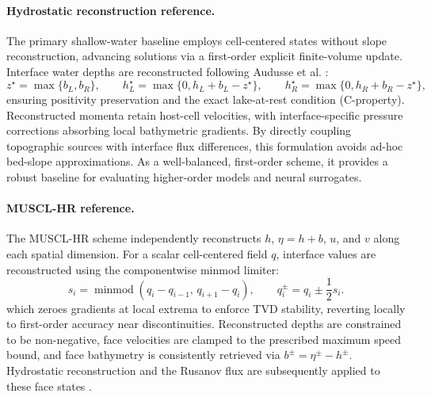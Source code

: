 \paragraph{Hydrostatic reconstruction reference.} The primary shallow-water baseline employs cell-centered states without slope reconstruction, advancing solutions via a first-order explicit finite-volume update. Interface water depths are reconstructed following Audusse et al. \citep{audusse2004hydrostatic}:
\begin{equation}
z ^ \star = \max\{b_L, b_R\}, \qquad
h_L ^ \star = \max\{0, h_L + b_L - z ^ \star\}, \qquad
h_R ^ \star = \max\{0, h_R + b_R - z ^ \star\},
\end{equation}
ensuring positivity preservation and the exact lake-at-rest condition (C-property). Reconstructed momenta retain host-cell velocities, with interface-specific pressure corrections absorbing local bathymetric gradients. By directly coupling topographic sources with interface flux differences, this formulation avoids ad-hoc bed-slope approximations. As a well-balanced, first-order scheme, it provides a robust baseline for evaluating higher-order models and neural surrogates.

\paragraph{MUSCL-HR reference.}
The MUSCL-HR scheme independently reconstructs $h$, $\eta = h + b$, $u$, and $v$ along each spatial dimension. For a scalar cell-centered field $q$, interface values are reconstructed using the componentwise minmod limiter:
\begin{equation}
s_i = \operatorname{minmod}(q_i - q_{i - 1},\, q_{i + 1} - q_i),
\qquad
q_i ^ \pm = q_i \pm\frac{1}{2}s_i.
\end{equation}
which zeroes gradients at local extrema to enforce TVD stability, reverting locally to first-order accuracy near discontinuities. Reconstructed depths are constrained to be non-negative, face velocities are clamped to the prescribed maximum speed bound, and face bathymetry is consistently retrieved via $b ^ \pm = \eta ^ \pm - h ^ \pm$. Hydrostatic reconstruction and the Rusanov flux are subsequently applied to these face states \citep{clain2016secondorder,hou2015muscl}.

